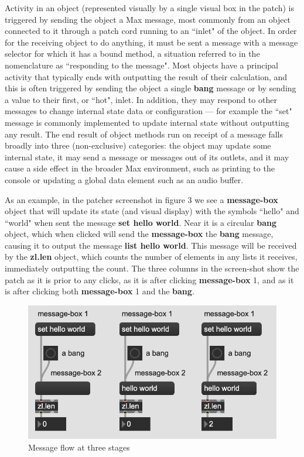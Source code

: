 \documentclass[acmsmall, anonymous, review]{acmart}
\begin{document}
Activity in an object (represented visually by a single visual box in the patch) is triggered
by sending the object a Max message, most commonly from an object connected to it
through a patch cord running to an ``inlet" of the object. 
In order for the receiving object to do anything, it must 
be sent a message with a message selector for which it has a bound method,
a situation referred to in the nomenclature as ``responding to the message". Most objects
have a principal activity that typically ends with outputting the result of their calculation, and this is
often triggered by sending the object a single \textbf{bang} message or by sending a value to 
their first, or ``hot", inlet. In addition, they may respond to other messages to change internal state
data or configuration --- for example the ``set" message is commonly implemented to update internal
state without outputting any result. The end result of object methods run on receipt of a message falls broadly
into three (non-exclusive) categories: the object may update some internal state, it may send a
message or messages out of its outlets, and it may cause a side effect in the broader
Max environment, such as printing to the console or updating a global data element such as
an audio buffer.

As an example, in the patcher screenshot in figure 3 we see a \textbf{message-box} object that will update
its state (and visual display) with the symbols ``hello" and ``world" when sent the message 
\textbf{set hello world}. Near it is a circular \textbf{bang} object, which when clicked will send the
\textbf{message-box} the \textbf{bang} message, causing it to output the message \textbf{list hello world}.
This message will be received by the \textbf{zl.len} object, which counts the number of elements 
in any lists it receives, immediately outputting the count. The three columns in the screen-shot
show the patch as it is prior to any clicks, as it is after clicking \textbf{message-box} 1,
and as it is after clicking both \textbf{message-box} 1 and the \textbf{bang}.

\begin{figure}[H]
  \centering
  \includegraphics[width=.5\linewidth]{fig-2-message-flow}
  \caption{Message flow at three stages}
\end{figure}
\end{document}
